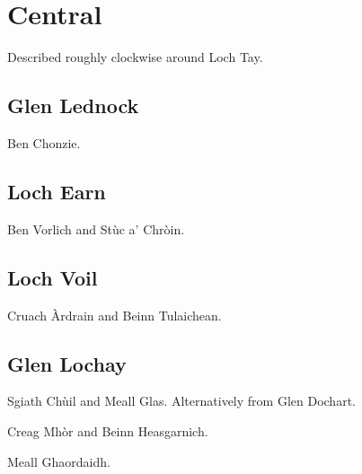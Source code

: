 
\section{Central}

Described roughly clockwise around Loch Tay.


\subsection{Glen Lednock}

\begin{munros}
\item
Ben Chonzie.
\end{munros}


\subsection{Loch Earn}

\begin{munros}
\item
Ben Vorlich and Stùc a' Chròin.  \tick
\end{munros}



\subsection{Loch Voil}

\begin{munros}
\item
Cruach Àrdrain and Beinn Tulaichean.  \tick
\end{munros}


\subsection{Glen Lochay}

\begin{munros}
\item
Sgiath Chùil and Meall Glas.  Alternatively from Glen Dochart.

\item
Creag Mhòr and Beinn Heasgarnich.

\item
Meall Ghaordaidh.
\end{munros}

